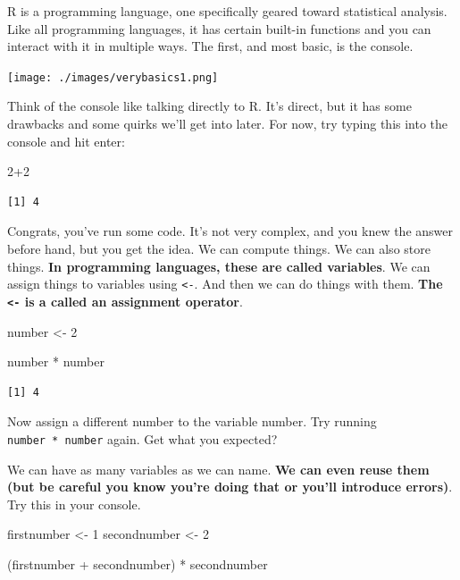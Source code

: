 \documentclass[
  letterpaper,
  DIV=11,
  numbers=noendperiod]{scrreprt}
\newenvironment{Shaded}{\begin{snugshade}}{\end{snugshade}}
\newcommand{\DecValTok}[1]{\textcolor[rgb]{0.68,0.00,0.00}{#1}}
\newcommand{\NormalTok}[1]{\textcolor[rgb]{0.00,0.23,0.31}{#1}}
\newcommand{\OtherTok}[1]{\textcolor[rgb]{0.00,0.23,0.31}{#1}}
\newcommand{\SpecialCharTok}[1]{\textcolor[rgb]{0.37,0.37,0.37}{#1}}
\begin{document}
R is a programming language, one specifically geared toward statistical
analysis. Like all programming languages, it has certain built-in
functions and you can interact with it in multiple ways. The first, and
most basic, is the console.

\texttt{[image: ./images/verybasics1.png]}

Think of the console like talking directly to R. It's direct, but it has
some drawbacks and some quirks we'll get into later. For now, try typing
this into the console and hit enter:

\begin{Shaded}
\begin{Highlighting}[]
\DecValTok{2}\SpecialCharTok{+}\DecValTok{2}
\end{Highlighting}
\end{Shaded}

\begin{verbatim}
[1] 4
\end{verbatim}

Congrats, you've run some code. It's not very complex, and you knew the
answer before hand, but you get the idea. We can compute things. We can
also store things. \textbf{In programming languages, these are called
variables}. We can assign things to variables using
\texttt{\textless{}-}. And then we can do things with them. \textbf{The
\texttt{\textless{}-} is a called an assignment operator}.

\begin{Shaded}
\begin{Highlighting}[]
\NormalTok{number }\OtherTok{\textless{}{-}} \DecValTok{2}

\NormalTok{number }\SpecialCharTok{*}\NormalTok{ number}
\end{Highlighting}
\end{Shaded}

\begin{verbatim}
[1] 4
\end{verbatim}

Now assign a different number to the variable number. Try running
\texttt{number\ *\ number} again. Get what you expected?

We can have as many variables as we can name. \textbf{We can even reuse
them (but be careful you know you're doing that or you'll introduce
errors)}. Try this in your console.

\begin{Shaded}
\begin{Highlighting}[]
\NormalTok{firstnumber }\OtherTok{\textless{}{-}} \DecValTok{1}
\NormalTok{secondnumber }\OtherTok{\textless{}{-}} \DecValTok{2} 

\NormalTok{(firstnumber }\SpecialCharTok{+}\NormalTok{ secondnumber) }\SpecialCharTok{*}\NormalTok{ secondnumber}
\end{Highlighting}
\end{Shaded}
\end{document}
